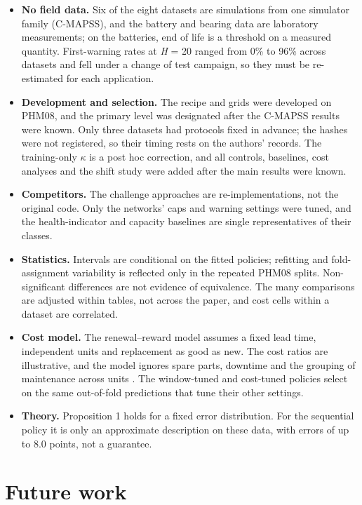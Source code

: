 \documentclass[a4paper,fleqn,doubleblind]{cas-dc}
\begin{document}
\begin{itemize}[leftmargin=1.2em,itemsep=2pt]
\item \textbf{No field data.} Six of the eight datasets are simulations from one simulator family (C-MAPSS), and the battery and bearing data are laboratory measurements; on the batteries, end of life is a threshold on a measured quantity. First-warning rates at \textit{H} = 20 ranged from 0\% to 96\% across datasets and fell under a change of test campaign, so they must be re-estimated for each application.
\item \textbf{Development and selection.} The recipe and grids were developed on PHM08, and the primary level was designated after the C-MAPSS results were known. Only three datasets had protocols fixed in advance; the hashes were not registered, so their timing rests on the authors' records. The training-only $\kappa$ is a post hoc correction, and all controls, baselines, cost analyses and the shift study were added after the main results were known.
\item \textbf{Competitors.} The challenge approaches are re-implementations, not the original code. Only the networks' caps and warning settings were tuned, and the health-indicator and capacity baselines are single representatives of their classes.
\item \textbf{Statistics.} Intervals are conditional on the fitted policies; refitting and fold-assignment variability is reflected only in the repeated PHM08 splits. Non-significant differences are not evidence of equivalence. The many comparisons are adjusted within tables, not across the paper, and cost cells within a dataset are correlated.
\item \textbf{Cost model.} The renewal--reward model assumes a fixed lead time, independent units and replacement as good as new. The cost ratios are illustrative, and the model ignores spare parts, downtime and the grouping of maintenance across units \cite{depater2022,mitici2023}. The window-tuned and cost-tuned policies select on the same out-of-fold predictions that tune their other settings.
\item \textbf{Theory.} Proposition 1 holds for a fixed error distribution. For the sequential policy it is only an approximate description on these data, with errors of up to 8.0 points, not a guarantee.
\end{itemize}

\section{Future work}\label{sec:8}
\end{document}
